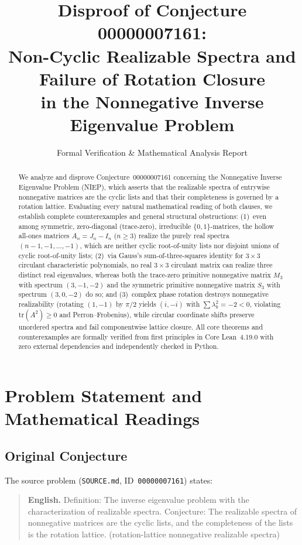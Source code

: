 \documentclass[11pt]{article}
\title{\textbf{Disproof of Conjecture 00000007161:\\
Non-Cyclic Realizable Spectra and Failure of Rotation Closure\\
in the Nonnegative Inverse Eigenvalue Problem}}
\author{Formal Verification \& Mathematical Analysis Report}
\date{}
\theoremstyle{definition}
\theoremstyle{remark}
\begin{document}
\maketitle

\begin{abstract}
We analyze and disprove Conjecture~00000007161 concerning the Nonnegative Inverse
Eigenvalue Problem (NIEP), which asserts that the realizable spectra of entrywise
nonnegative matrices are the cyclic lists and that their completeness is governed by a
rotation lattice. Evaluating every natural mathematical reading of both clauses, we
establish complete counterexamples and general structural obstructions:
(1)~even among symmetric, zero-diagonal (trace-zero), irreducible $\{0,1\}$-matrices,
the hollow all-ones matrices $A_n = J_n - I_n$ ($n \ge 3$) realize the purely real spectra
$(n-1, -1, \dots, -1)$, which are neither cyclic root-of-unity lists nor disjoint unions
of cyclic root-of-unity lists; (2)~via Gauss's sum-of-three-squares identity for
$3 \times 3$ circulant characteristic polynomials, no real $3 \times 3$ circulant matrix
can realize three distinct real eigenvalues, whereas both the trace-zero primitive
nonnegative matrix $M_3$ with spectrum $(3,-1,-2)$ and the symmetric primitive nonnegative
matrix $S_3$ with spectrum $(3,0,-2)$ do so; and (3)~complex phase rotation destroys
nonnegative realizability (rotating $(1,-1)$ by $\pi/2$ yields $(i,-i)$ with
$\sum \lambda_k^2 = -2 < 0$, violating $\mathrm{tr}(A^2) \ge 0$ and Perron--Frobenius),
while circular coordinate shifts preserve unordered spectra and fail componentwise lattice
closure. All core theorems and counterexamples are formally verified from first principles
in Core Lean~4.19.0 with zero external dependencies and independently checked in Python.
\end{abstract}

\section{Problem Statement and Mathematical Readings}

\subsection{Original Conjecture}

The source problem (\texttt{SOURCE.md}, ID~\texttt{00000007161}) states:

\begin{quote}
\textbf{English.} Definition: The inverse eigenvalue problem with the characterization of
realizable spectra. Conjecture: The realizable spectra of nonnegative matrices are the
cyclic lists, and the completeness of the lists is the rotation lattice.
(rotation-lattice nonnegative realizable spectra)
\end{quote}
\end{document}
